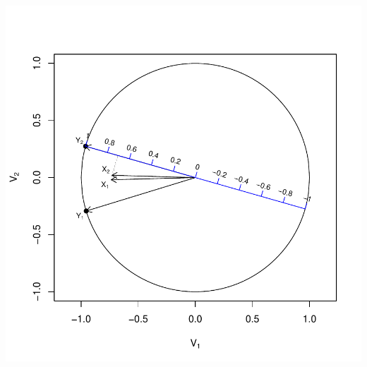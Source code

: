 \documentclass[a4paper]{article}
\begin{document}
\includegraphics{CalibrationGuide-014}
\end{document}
